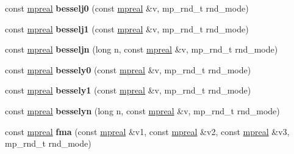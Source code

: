 \begin{DoxyCompactItemize}
\item 
\mbox{\label{classmpfr_1_1mpreal_ac621d3c47fe08e541bdfdf683591584b}} 
const \hyperlink{classmpfr_1_1mpreal}{mpreal} {\bfseries besselj0} (const \hyperlink{classmpfr_1_1mpreal}{mpreal} \&v, mp\+\_\+rnd\+\_\+t rnd\+\_\+mode)
\item 
\mbox{\label{classmpfr_1_1mpreal_a0f2d0579979b0debfe5df092b0c74920}} 
const \hyperlink{classmpfr_1_1mpreal}{mpreal} {\bfseries besselj1} (const \hyperlink{classmpfr_1_1mpreal}{mpreal} \&v, mp\+\_\+rnd\+\_\+t rnd\+\_\+mode)
\item 
\mbox{\label{classmpfr_1_1mpreal_a17832cc4a85391f9c717b13a35fd9b37}} 
const \hyperlink{classmpfr_1_1mpreal}{mpreal} {\bfseries besseljn} (long n, const \hyperlink{classmpfr_1_1mpreal}{mpreal} \&v, mp\+\_\+rnd\+\_\+t rnd\+\_\+mode)
\item 
\mbox{\label{classmpfr_1_1mpreal_a7f58635ca88d077d049ceab6d6af9a79}} 
const \hyperlink{classmpfr_1_1mpreal}{mpreal} {\bfseries bessely0} (const \hyperlink{classmpfr_1_1mpreal}{mpreal} \&v, mp\+\_\+rnd\+\_\+t rnd\+\_\+mode)
\item 
\mbox{\label{classmpfr_1_1mpreal_aee1c2c077a97dcb04625a598c2fbffac}} 
const \hyperlink{classmpfr_1_1mpreal}{mpreal} {\bfseries bessely1} (const \hyperlink{classmpfr_1_1mpreal}{mpreal} \&v, mp\+\_\+rnd\+\_\+t rnd\+\_\+mode)
\item 
\mbox{\label{classmpfr_1_1mpreal_ac8672e04724f57ca557d19114333e52f}} 
const \hyperlink{classmpfr_1_1mpreal}{mpreal} {\bfseries besselyn} (long n, const \hyperlink{classmpfr_1_1mpreal}{mpreal} \&v, mp\+\_\+rnd\+\_\+t rnd\+\_\+mode)
\item 
\mbox{\label{classmpfr_1_1mpreal_a6118fb494fa82a8449a1c9b8c22afabb}} 
const \hyperlink{classmpfr_1_1mpreal}{mpreal} {\bfseries fma} (const \hyperlink{classmpfr_1_1mpreal}{mpreal} \&v1, const \hyperlink{classmpfr_1_1mpreal}{mpreal} \&v2, const \hyperlink{classmpfr_1_1mpreal}{mpreal} \&v3, mp\+\_\+rnd\+\_\+t rnd\+\_\+mode)
\item 
\mbox{\label{classmpfr_1_1mpreal_a912bc2903eda39e264e302e884e0f509}} 

\end{DoxyCompactItemize}
